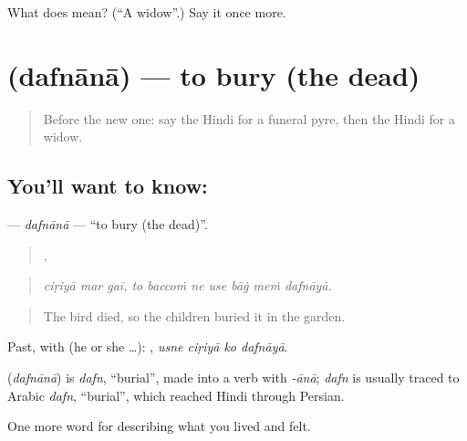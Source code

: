 \begin{tcolorbox}[breakable,colback=teal!4,colframe=teal!35!black,title={Before you move on}]
What does  mean? (\textquotedblleft{}A widow\textquotedblright{}.) Say it once more.
\end{tcolorbox}
\section[\texorpdfstring{\hi{दफ़नाना} (dafnānā)}{दफ़नाना (dafnānā)}]{ (dafnānā) — to bury (the dead)}

\label{lesson:HI-C505-dafnana}



\begin{quote}
Before the new one: say the Hindi for a funeral pyre, then the Hindi for a widow.
\end{quote}

\subsection*{You'll want to know: }
\textbf{} — \emph{dafnānā} — \textquotedblleft{}to bury (the dead)\textquotedblright{}.

\begin{quote}
  ,       
\end{quote}

\begin{quote}
\emph{ciṛiyā mar gaī, to baccoṁ ne use bāġ meṁ dafnāyā.}
\end{quote}

\begin{quote}
The bird died, so the children buried it in the garden.
\end{quote}

Past, with  (he or she …):    , \emph{usne ciṛiyā ko dafnāyā}.

\begin{cousinweb}
\textbf{} (\emph{dafnānā}) is \emph{dafn}, \textquotedblleft{}burial\textquotedblright{}, made into a verb with \emph{-ānā}; \emph{dafn} is usually traced to Arabic \emph{dafn}, \textquotedblleft{}burial\textquotedblright{}, which reached Hindi through Persian.
\end{cousinweb}

\begin{grammarlens}[title={What you've built}]
One more word for describing what you lived and felt.
\end{grammarlens}

